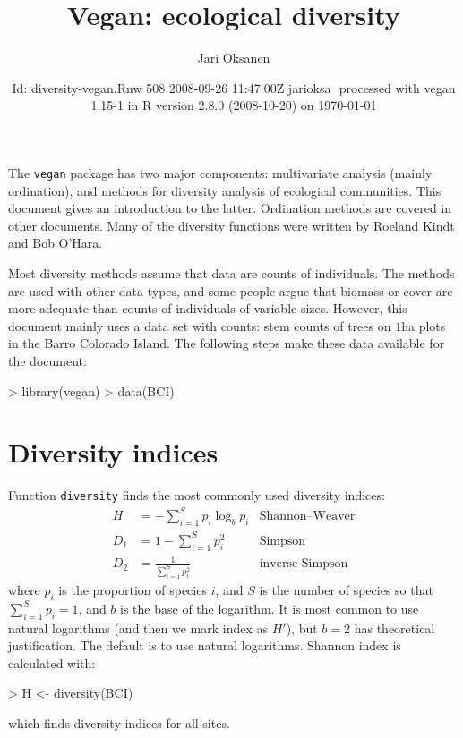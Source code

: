 \documentclass[a4paper,10pt]{amsart}
\title{Vegan: ecological diversity}
\author{Jari Oksanen}
\date{$ $Id: diversity-vegan.Rnw 508 2008-09-26 11:47:00Z jarioksa $ $
  processed with vegan 1.15-1
  in R version 2.8.0 (2008-10-20) on \today}
\begin{document}


\maketitle

\tableofcontents

\noindent The \texttt{vegan} package has two major components:
multivariate analysis (mainly ordination), and methods for diversity
analysis of ecological communities.  This document gives an
introduction to the latter.  Ordination methods are covered in other
documents.  Many of the diversity functions were written by Roeland
Kindt and Bob O'Hara.

Most diversity methods assume that data are counts of individuals.
The methods are used with other data types, and some people argue that
biomass or cover are more adequate than counts of individuals of
variable sizes.  However, this document mainly uses a data set with
counts: stem counts of trees on $1$ha plots in the Barro Colorado
Island.  The following steps make these data available for the
document:
\begin{Schunk}
\begin{Sinput}
> library(vegan)
> data(BCI)
\end{Sinput}
\end{Schunk}

\section{Diversity indices}

Function \texttt{diversity} finds the most commonly used diversity
indices:
\begin{align}
H &= - \sum_{i=1}^S p_i \log_b  p_i & \text{Shannon--Weaver}\\
D_1 &= 1 - \sum_{i=1}^S p_i^2  &\text{Simpson}\\
D_2 &= \frac{1}{\sum_{i=1}^S p_i^2}  &\text{inverse Simpson}
\end{align}
where $p_i$ is the proportion of species $i$, and $S$ is the number of
species so that $\sum_{i=1}^S p_i = 1$, and $b$ is the base of the
logarithm.  It is most common to use natural logarithms (and then we
mark index as $H'$), but $b=2$ has
theoretical justification. The default is to use natural logarithms.
Shannon index is calculated with:
\begin{Schunk}
\begin{Sinput}
> H <- diversity(BCI)
\end{Sinput}
\end{Schunk}
which finds diversity indices for all sites.
\end{document}
